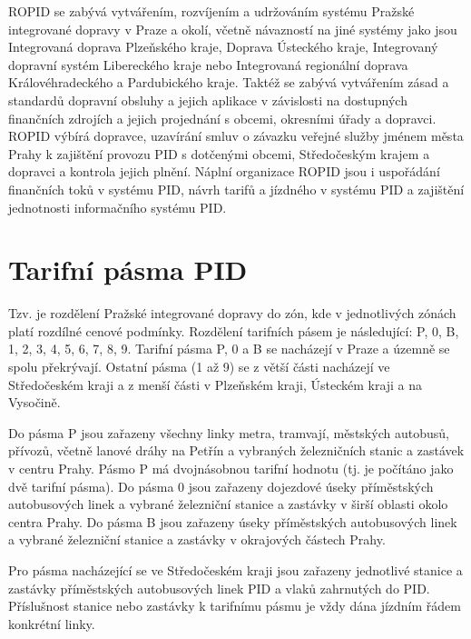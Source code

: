 ROPID se zabývá vytvářením, rozvíjením a udržováním systému Pražské integrované dopravy v Praze a okolí,
včetně návazností na jiné systémy jako jsou Integrovaná doprava Plzeňského kraje,
Doprava Ústeckého kraje, Integrovaný dopravní systém Libereckého kraje nebo 
Integrovaná regionální doprava Královéhradeckého a Pardubického kraje.
Taktéž se zabývá vytvářením zásad a standardů dopravní obsluhy a jejich aplikace v závislosti
na dostupných finančních zdrojích a jejich projednání s obcemi, okresními úřady a dopravci.
ROPID výbírá dopravce, uzavírání smluv o závazku veřejné služby jménem města Prahy 
k zajištění provozu PID s dotčenými obcemi, Středočeským krajem a dopravci a kontrola jejich plnění.
Náplní organizace ROPID jsou i uspořádání finančních toků v systému PID, návrh tarifů a jízdného v systému PID a
zajištění jednotnosti informačního systému PID.  \cite{wikipedia-ropid}

\section{Tarifní pásma PID}
                    
Tzv.  je rozdělení Pražské integrované dopravy do zón, kde v jednotlivých
zónách platí rozdílné cenové podmínky. Rozdělení tarifních pásem je následující:
P, 0, B, 1, 2, 3, 4, 5, 6, 7, 8, 9. Tarifní pásma P, 0 a B se nacházejí v Praze a územně
se spolu překrývají. Ostatní pásma (1 až 9) se z větší části nacházejí ve Středočeském kraji a z
menší části v Plzeňském kraji, Ústeckém kraji a na Vysočině.

Do pásma P jsou zařazeny všechny linky metra, tramvají, městských autobusů, přívozů,
včetně lanové dráhy na Petřín a vybraných železničních stanic a zastávek v centru Prahy.
Pásmo P má dvojnásobnou tarifní hodnotu (tj. je počítáno jako dvě tarifní pásma).
Do pásma 0 jsou zařazeny dojezdové úseky příměstských autobusových linek a vybrané
železniční stanice a zastávky v širší oblasti okolo centra Prahy.
Do pásma B jsou zařazeny úseky příměstských autobusových linek a vybrané 
železniční stanice a zastávky v okrajových částech Prahy. 

Pro pásma nacházející se ve Středočeském kraji jsou zařazeny jednotlivé stanice 
a zastávky příměstských autobusových linek PID a vlaků zahrnutých do PID. 
Příslušnost stanice nebo zastávky k tarifnímu pásmu je vždy dána jízdním řádem konkrétní linky.\cite{pid}

